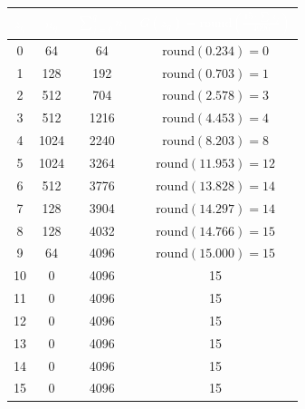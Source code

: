 \documentclass[12pt]{article}
\begin{document}
\begin{stepbox}
\begin{center}
\begin{tabular}{c c c c}
\rowcolor{USC_Garnet!80}
\textcolor{white}{$z_q$} & \textcolor{white}{$n_q$} & \textcolor{white}{$\displaystyle\sum_{j=0}^{q} n_j$} & \textcolor{white}{$G(z_q) = \text{round}\!\left(\frac{15 \cdot \sum n_j}{4096}\right)$} \\
\hline
0  & 64   & 64   & $\text{round}(0.234) = 0$  \\
1  & 128  & 192  & $\text{round}(0.703) = 1$  \\
2  & 512  & 704  & $\text{round}(2.578) = 3$  \\
3  & 512  & 1216 & $\text{round}(4.453) = 4$  \\
4  & 1024 & 2240 & $\text{round}(8.203) = 8$  \\
5  & 1024 & 3264 & $\text{round}(11.953) = 12$ \\
6  & 512  & 3776 & $\text{round}(13.828) = 14$ \\
7  & 128  & 3904 & $\text{round}(14.297) = 14$ \\
8  & 128  & 4032 & $\text{round}(14.766) = 15$ \\
9  & 64   & 4096 & $\text{round}(15.000) = 15$ \\
10 & 0    & 4096 & 15 \\
11 & 0    & 4096 & 15 \\
12 & 0    & 4096 & 15 \\
13 & 0    & 4096 & 15 \\
14 & 0    & 4096 & 15 \\
15 & 0    & 4096 & 15 \\
\hline
\end{tabular}
\end{center}
\end{stepbox}
\end{document}

